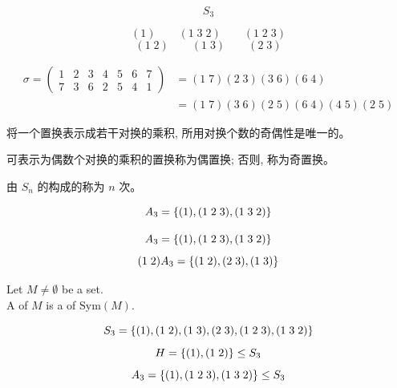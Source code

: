 \begin{frame}{}
  \[
    S_{3}
  \]
  

  \pause
  \[
    (1) \qquad (1\; 3\; 2) \qquad (1\; 2\; 3)
  \]
  \[
    (1\; 2) \qquad (1\; 3) \qquad (2\; 3) 
  \]
\end{frame}

\begin{frame}{}
  \begin{align*}
    \sigma = \begin{pmatrix}
      1 & 2 & 3 & 4 & 5 & 6 & 7 \\
      7 & 3 & 6 & 2 & 5 & 4 & 1
    \end{pmatrix} &=
    (1\;7) (2\;3) (3\;6) (6\;4) \\
    &= (1\;7) (3\;6) (2\;5) (6\;4) (4\;5) (2\;5)
  \end{align*}

  \pause
  \vspace{0.30cm}
  \begin{theorem}
    将一个置换表示成若干对换的乘积, 所用对换个数的奇偶性是唯一的。
  \end{theorem}
\end{frame}

\begin{frame}{}
  \begin{definition}
    可表示为偶数个对换的乘积的置换称为偶置换; 否则, 称为奇置换。
  \end{definition}

  \pause
  \vspace{0.80cm}
  \begin{definition}
    由 $S_{n}$ 的构成的称为 $n$ 次。
  \end{definition}

  \pause
  \[
    A_{3} = \{(1), (1\;2\;3), (1\;3\;2)\}
  \]
\end{frame}

\begin{frame}{}

  \[
    A_{3} = \{(1), (1\;2\;3), (1\;3\;2)\}
  \]
  \[
    (1\;2) A_{3} = \{(1\;2), (2\;3), (1\;3)\}
  \]
\end{frame}

\begin{frame}
  \begin{definition}
    Let $M \neq \emptyset$ be a set. \\
    A  of $M$ is a  of $\text{Sym}(M)$.
  \end{definition}

  \pause
  \[
    S_{3} = \{(1), (1\; 2), (1\; 3), (2\; 3), (1\; 2\; 3), (1\; 3\; 2)\}
  \]
  \pause
  \[
    H = \{(1), (1\; 2)\} \le S_{3}
  \]
  \pause
  \[
    A_{3} = \{(1), (1\; 2\; 3), (1\; 3\; 2)\} \le S_{3}
  \]
\end{frame}
